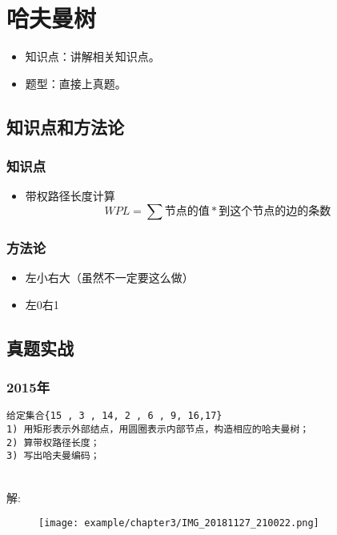 \chapter{哈夫曼树}
\label{chap3}

\begin{itemize}[noitemsep,topsep=0pt,parsep=0pt,partopsep=0pt]
	\item 知识点：讲解相关知识点。
	\item 题型：直接上真题。
\end{itemize}

\section{知识点和方法论}

\subsection{知识点}
\begin{itemize}[noitemsep,topsep=0pt,parsep=0pt,partopsep=0pt]
	\item 带权路径长度计算$$ WPL = \sum \mbox{节点的值} * \mbox{到这个节点的边的条数} $$
\end{itemize}


\subsection{方法论}
\begin{itemize}[noitemsep,topsep=0pt,parsep=0pt,partopsep=0pt]
	\item 左小右大（虽然不一定要这么做）
	\item 左0右1
\end{itemize}


\section{真题实战}


\subsection{2015年}

\begin{lstlisting}[basicstyle=\small\ttfamily, caption={}, numbers=none]
给定集合{15 , 3 , 14, 2 , 6 , 9, 16,17}
1) 用矩形表示外部结点，用圆圈表示内部节点，构造相应的哈夫曼树；
2) 算带权路径长度；
3) 写出哈夫曼编码；
\end{lstlisting}
~\\
解:\newline
\begin{figure}[H]
	\centering  %
	\texttt{[image: example/chapter3/IMG\_20181127\_210022.png]}
\end{figure}

